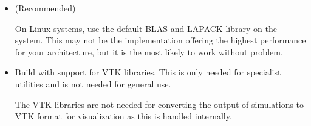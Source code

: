 \begin{itemize}
    \item {} (Recommended)

    On Linux systems, use the default BLAS and LAPACK library on the system.
    This may not be the implementation offering the highest performance for your
    architecture, but it is the most likely to work without problem.

    \item {}

    Build \nekpp with support for VTK libraries. This is only needed for
    specialist utilities and is not needed for general use.

    \begin{notebox}
    The VTK libraries are not needed for converting the output of simulations to
    VTK format for visualization as this is handled internally.
    \end{notebox}
\end{itemize}

